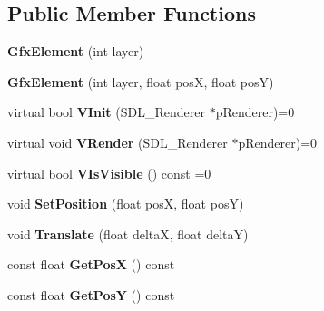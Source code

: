 \subsection*{Public Member Functions}
\begin{DoxyCompactItemize}
\item 
\hypertarget{classGfxElement_adf7537e47ae8bd1095e8638ba719329c}{{\bfseries Gfx\-Element} (int layer)}\label{classGfxElement_adf7537e47ae8bd1095e8638ba719329c}

\item 
\hypertarget{classGfxElement_ab29c43cd8d53744a94a92e350adc8f36}{{\bfseries Gfx\-Element} (int layer, float pos\-X, float pos\-Y)}\label{classGfxElement_ab29c43cd8d53744a94a92e350adc8f36}

\item 
\hypertarget{classGfxElement_a1586e8b645919da7b6f5523283c3e504}{virtual bool {\bfseries V\-Init} (S\-D\-L\-\_\-\-Renderer $\ast$p\-Renderer)=0}\label{classGfxElement_a1586e8b645919da7b6f5523283c3e504}

\item 
\hypertarget{classGfxElement_a2bbacedc85a38d0c689af0d544c91afc}{virtual void {\bfseries V\-Render} (S\-D\-L\-\_\-\-Renderer $\ast$p\-Renderer)=0}\label{classGfxElement_a2bbacedc85a38d0c689af0d544c91afc}

\item 
\hypertarget{classGfxElement_a46a99a31e17e22e9ee1b553074d6d4a0}{virtual bool {\bfseries V\-Is\-Visible} () const =0}\label{classGfxElement_a46a99a31e17e22e9ee1b553074d6d4a0}

\item 
\hypertarget{classGfxElement_aae748b2e2153b9ce379dd5b877ebca7d}{void {\bfseries Set\-Position} (float pos\-X, float pos\-Y)}\label{classGfxElement_aae748b2e2153b9ce379dd5b877ebca7d}

\item 
\hypertarget{classGfxElement_a7ce355c8e9f1fcde5c2396fbb21c5ed5}{void {\bfseries Translate} (float delta\-X, float delta\-Y)}\label{classGfxElement_a7ce355c8e9f1fcde5c2396fbb21c5ed5}

\item 
\hypertarget{classGfxElement_a769887fa72f8e98233fb76ea178a4863}{const float {\bfseries Get\-Pos\-X} () const }\label{classGfxElement_a769887fa72f8e98233fb76ea178a4863}

\item 
\hypertarget{classGfxElement_a7dc6347593ba1e4c9eb2a9ef068c2db8}{const float {\bfseries Get\-Pos\-Y} () const }\label{classGfxElement_a7dc6347593ba1e4c9eb2a9ef068c2db8}


\end{DoxyCompactItemize}
